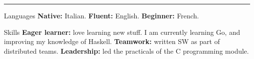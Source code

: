 \vspace{-3mm}
\rule{\textwidth}{0.5pt}\vspace{-1mm}

\begin{cvskills}

\cvskill
{Languages}
{\textbf{Native:} Italian.\hspace{+2mm} \textbf{Fluent:} English.\hspace{+2mm}
\textbf{Beginner:} French.}

\cvskill
{Skills}
{\textbf{Eager learner:} love learning new stuff. I am currently learning Go, 
and improving my knowledge of Haskell.\newline
\textbf{Teamwork:} written SW as part of distributed teams. 
\textbf{Leadership:} led the practicals of the C programming module.}

\end{cvskills}